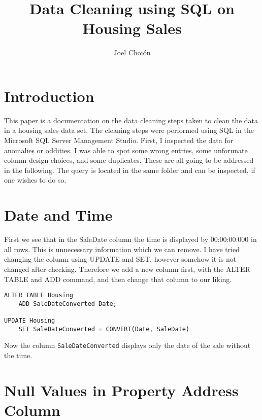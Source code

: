 \documentclass[11pt]{article}
\title{Data Cleaning using SQL on Housing Sales}
\author{Joel Choi\'on}
\date{}
\begin{document}
\maketitle

\section{Introduction}\label{section-introduction}

This paper is a documentation on the data cleaning steps taken to clean the data in a housing sales data set. The cleaning steps were performed using SQL in the Microsoft SQL Server Management Studio.
First, I inspected the data for anomalies or oddities. I was able to spot some wrong entries, some unforunate column design choices, and some duplicates. These are all going to be addressed in the following. The query is located in the same folder and can be inspected, if one wishes to do so.

\section{Date and Time}
First we see that in the SaleDate column the time is displayed by 00:00:00.000 in all rows.
This is unnecessary information which we can remove. I have tried changing the column using UPDATE and SET, however somehow it is not changed after checking.
Therefore we add a new column first, with the ALTER TABLE and ADD command, and then change that column to our liking.
\begin{lstlisting}
ALTER TABLE Housing
	ADD SaleDateConverted Date;

UPDATE Housing
	SET SaleDateConverted = CONVERT(Date, SaleDate)

\end{lstlisting}
Now the column \texttt{SaleDateConverted} displays only the date of the sale without the time.


\section{Null Values in Property Address Column}
\end{document}
